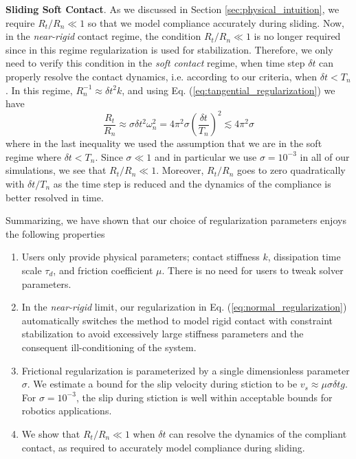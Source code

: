 \textbf{Sliding Soft Contact}. As we discussed in Section
\ref{sec:physical_intuition}, we require $R_t/R_n\ll 1$ so that we model
compliance accurately during sliding. Now, in the \emph{near-rigid} contact
regime, the condition $R_t/R_n\ll 1$ is no longer required since in this regime
regularization is used for stabilization. Therefore, we only need to verify this condition in the \emph{soft contact}
regime, when time step $\delta t$ can properly resolve the contact dynamics,
i.e. according to our criteria, when $\delta t < T_n$. In this regime,
$R_n^{-1}\approx \delta t^2k$, and using Eq.
(\ref{eq:tangential_regularization}) we have
\begin{equation*}
    \frac{R_t}{R_n}\approx \sigma \delta t^2 \omega_n^2=4\pi^2\sigma\left(\frac{\delta t}{T_n}\right)^2
    \lesssim 4\pi^2\sigma
\end{equation*}
where in the last inequality we used the assumption that we are in the soft
regime where $\delta t < T_n$. Since $\sigma \ll 1$ and in particular we use
$\sigma=10^{-3}$ in all of our simulations, we see that $R_t/R_n \ll 1$.
Moreover, $R_t/R_n$ goes to zero quadratically with $\delta t/T_n$ as the time
step is reduced and the dynamics of the compliance is better resolved in time.

Summarizing, we have shown that our choice of regularization parameters enjoys
the following properties
\begin{enumerate}
    \item Users only provide physical parameters; contact stiffness $k$,
    dissipation time scale $\tau_d$, and friction coefficient $\mu$. There is no
    need for users to tweak solver parameters.
    \item In the \emph{near-rigid} limit, our regularization in Eq.
    (\ref{eq:normal_regularization}) automatically switches the method to model
    rigid contact with constraint stabilization to avoid excessively large
    stiffness parameters and the consequent ill-conditioning of the system.
    \item Frictional regularization is parameterized by a single dimensionless
    parameter $\sigma$. We estimate a bound for the slip velocity during
    stiction to be $v_s \approx \mu \sigma \delta t g$. For $\sigma=10^{-3}$,
    the slip during stiction is well within acceptable bounds for robotics
    applications.
    \item We show that $R_t/R_n \ll 1$ when $\delta t$ can resolve the dynamics
    of the compliant contact, as required to accurately model compliance during
    sliding.
\end{enumerate}
